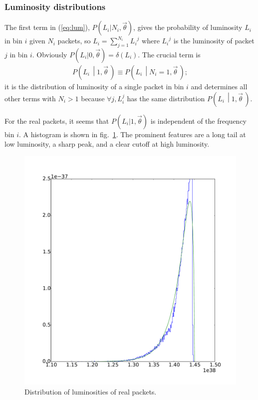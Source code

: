 \documentclass[a4,12pt]{article}
\newcommand{\given}[2]{\left(#1\, \middle| #2 \, \right)}
\newcommand{\Lumi}{\ensuremath{L_i}}
\newcommand{\vecth}{\ensuremath{{\vec{\theta}}}}
\def \refeq#1{(\ref{eq:#1})}
\def \reffig#1{fig.~\ref{fig:#1}}
\begin{document}
\subsubsection{Luminosity distributions}

The first term in \refeq{lum}, $P(\Lumi | N_i, \vecth)$, gives the
probability of luminosity $\Lumi$ in bin $i$ given $N_i$ packets, so
$\Lumi = \sum_{j=1}^{N_i} \Lumi^j$ where $\Lumi^j$ is the luminosity
of packet $j$ in bin $i$. Obviously $P(\Lumi | 0, \vecth) =
\delta(\Lumi)$. The crucial term is
\begin{align}
  \label{eq:single-lum}
  P\given{\Lumi}{1, \vecth} \equiv P\given{L_i}{N_i=1,\vecth};
\end{align}
it is the distribution of luminosity of a single packet in bin $i$ and
determines all other terms with $N_i>1$ because $\forall j, L_i^j$ has
the same distribution $P\given{L_i}{1,\vecth}$.

For the real packets, it seems that $P(\Lumi | 1, \vecth)$ is
independent of the frequency bin $i$. A histogram is shown in
\reffig{hist}.  The prominent features are a long tail at low
luminosity, a sharp peak, and a clear cutoff at high luminosity.

\begin{figure}[h]
  \begin{center}
    \includegraphics[width=\textwidth]{fit}
  \end{center}
  \caption{Distribution of luminosities of real packets.}
  \label{fig:hist}
\end{figure}
\end{document}
